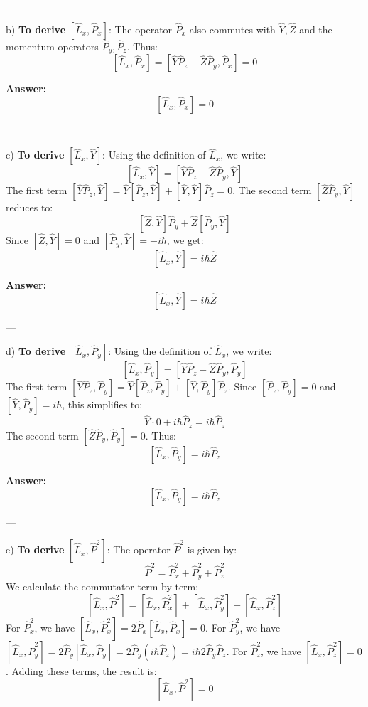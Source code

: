 ---

b) \textbf{To derive} $\left[\hat{L}_x, \hat{P}_x\right]$:  
The operator $\hat{P}_x$ also commutes with $\hat{Y}, \hat{Z}$ and the momentum operators $\hat{P}_y, \hat{P}_z$. Thus:
\[
[\hat{L}_x, \hat{P}_x] = [\hat{Y}\hat{P}_z - \hat{Z}\hat{P}_y, \hat{P}_x] = 0
\]

\textbf{Answer:}
\[
\left[\hat{L}_x, \hat{P}_x\right] = 0
\]

---

c) \textbf{To derive} $\left[\hat{L}_x, \hat{Y}\right]$:  
Using the definition of $\hat{L}_x$, we write:
\[
[\hat{L}_x, \hat{Y}] = [\hat{Y}\hat{P}_z - \hat{Z}\hat{P}_y, \hat{Y}]
\]
The first term $[\hat{Y}\hat{P}_z, \hat{Y}] = \hat{Y}[\hat{P}_z, \hat{Y}] + [\hat{Y}, \hat{Y}]\hat{P}_z = 0$. The second term $[\hat{Z}\hat{P}_y, \hat{Y}]$ reduces to:
\[
[\hat{Z}, \hat{Y}]\hat{P}_y + \hat{Z}[\hat{P}_y, \hat{Y}]
\]
Since $[\hat{Z}, \hat{Y}] = 0$ and $[\hat{P}_y, \hat{Y}] = -i\hbar$, we get:
\[
[\hat{L}_x, \hat{Y}] = i\hbar \hat{Z}
\]

\textbf{Answer:}
\[
\left[\hat{L}_x, \hat{Y}\right] = i\hbar \hat{Z}
\]

---

d) \textbf{To derive} $\left[\hat{L}_x, \hat{P}_y\right]$:  
Using the definition of $\hat{L}_x$, we write:
\[
[\hat{L}_x, \hat{P}_y] = [\hat{Y}\hat{P}_z - \hat{Z}\hat{P}_y, \hat{P}_y]
\]
The first term $[\hat{Y}\hat{P}_z, \hat{P}_y] = \hat{Y}[\hat{P}_z, \hat{P}_y] + [\hat{Y}, \hat{P}_y]\hat{P}_z$. Since $[\hat{P}_z, \hat{P}_y] = 0$ and $[\hat{Y}, \hat{P}_y] = i\hbar$, this simplifies to:
\[
\hat{Y} \cdot 0 + i\hbar \hat{P}_z = i\hbar \hat{P}_z
\]
The second term $[\hat{Z}\hat{P}_y, \hat{P}_y] = 0$. Thus:
\[
[\hat{L}_x, \hat{P}_y] = i\hbar \hat{P}_z
\]

\textbf{Answer:}
\[
\left[\hat{L}_x, \hat{P}_y\right] = i\hbar \hat{P}_z
\]

---

e) \textbf{To derive} $\left[\hat{L}_x, \hat{P}^2\right]$:  
The operator $\hat{P}^2$ is given by:
\[
\hat{P}^2 = \hat{P}_x^2 + \hat{P}_y^2 + \hat{P}_z^2
\]
We calculate the commutator term by term:
\[
[\hat{L}_x, \hat{P}^2] = [\hat{L}_x, \hat{P}_x^2] + [\hat{L}_x, \hat{P}_y^2] + [\hat{L}_x, \hat{P}_z^2]
\]
For $\hat{P}_x^2$, we have $[\hat{L}_x, \hat{P}_x^2] = 2\hat{P}_x[\hat{L}_x, \hat{P}_x] = 0$.  
For $\hat{P}_y^2$, we have $[\hat{L}_x, \hat{P}_y^2] = 2\hat{P}_y[\hat{L}_x, \hat{P}_y] = 2\hat{P}_y(i\hbar \hat{P}_z) = i\hbar 2\hat{P}_y\hat{P}_z$.  
For $\hat{P}_z^2$, we have $[\hat{L}_x, \hat{P}_z^2] = 0$.  
Adding these terms, the result is:
\[
[\hat{L}_x, \hat{P}^2] = 0
\]

